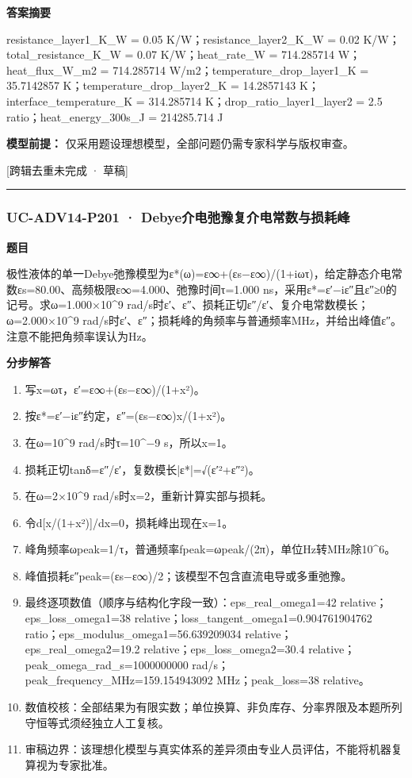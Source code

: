 \documentclass[UTF8,11pt,a4paper]{ctexart}
\begin{document}
\noindent\textbf{答案摘要}\par
resistance\_layer1\_K\_W = 0.05 K/W；resistance\_layer2\_K\_W = 0.02 K/W；total\_resistance\_K\_W = 0.07 K/W；heat\_rate\_W = 714.285714 W；heat\_flux\_W\_m2 = 714.285714 W/m2；temperature\_drop\_layer1\_K = 35.7142857 K；temperature\_drop\_layer2\_K = 14.2857143 K；interface\_temperature\_K = 314.285714 K；drop\_ratio\_layer1\_layer2 = 2.5 ratio；heat\_energy\_300s\_J = 214285.714 J\par
\noindent\textbf{模型前提：}
仅采用题设理想模型，全部问题仍需专家科学与版权审查。\par
\noindent\textcolor{red!65!black}{[跨辑去重未完成 · 草稿]} \par
\medskip\hrule\medskip
{}
\subsubsection*{UC-ADV14-P201 · Debye介电弛豫复介电常数与损耗峰}
\noindent\textbf{题目}\par
极性液体的单一Debye弛豫模型为ε*(ω)=ε∞+(εs−ε∞)/(1+iωτ)，给定静态介电常数εs=80.00、高频极限ε∞=4.000、弛豫时间τ=1.000 ns，采用ε*=ε′−iε″且ε″≥0的记号。求ω=1.000×10\textasciicircum{}9 rad/s时ε′、ε″、损耗正切ε″/ε′、复介电常数模长；ω=2.000×10\textasciicircum{}9 rad/s时ε′、ε″；损耗峰的角频率与普通频率MHz，并给出峰值ε″。注意不能把角频率误认为Hz。\par
\medskip\noindent\textbf{分步解答}
\begin{enumerate}
\item 写x=ωτ，ε′=ε∞+(εs−ε∞)/(1+x²)。
\item 按ε*=ε′−iε″约定，ε″=(εs−ε∞)x/(1+x²)。
\item 在ω=10\textasciicircum{}9 rad/s时τ=10\textasciicircum{}−9 s，所以x=1。
\item 损耗正切tanδ=ε″/ε′，复数模长|ε*|=√(ε′²+ε″²)。
\item 在ω=2×10\textasciicircum{}9 rad/s时x=2，重新计算实部与损耗。
\item 令d[x/(1+x²)]/dx=0，损耗峰出现在x=1。
\item 峰角频率ωpeak=1/τ，普通频率fpeak=ωpeak/(2π)，单位Hz转MHz除10\textasciicircum{}6。
\item 峰值损耗ε″peak=(εs−ε∞)/2；该模型不包含直流电导或多重弛豫。
\item 最终逐项数值（顺序与结构化字段一致）：eps\_real\_omega1=42 relative；eps\_loss\_omega1=38 relative；loss\_tangent\_omega1=0.904761904762 ratio；eps\_modulus\_omega1=56.639209034 relative；eps\_real\_omega2=19.2 relative；eps\_loss\_omega2=30.4 relative；peak\_omega\_rad\_s=1000000000 rad/s；peak\_frequency\_MHz=159.154943092 MHz；peak\_loss=38 relative。
\item 数值校核：全部结果为有限实数；单位换算、非负库存、分率界限及本题所列守恒等式须经独立人工复核。
\item 审稿边界：该理想化模型与真实体系的差异须由专业人员评估，不能将机器复算视为专家批准。
\end{enumerate}
\end{document}
